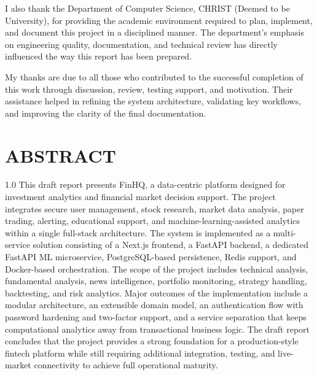 \documentclass[12pt,a4paper]{report}
\newcommand{\projectshort}{FinHQ}
\begin{document}
I also thank the Department of Computer Science, CHRIST (Deemed to be University), for providing the academic environment required to plan, implement, and document this project in a disciplined manner. The department's emphasis on engineering quality, documentation, and technical review has directly influenced the way this report has been prepared.

My thanks are due to all those who contributed to the successful completion of this work through discussion, review, testing support, and motivation. Their assistance helped in refining the system architecture, validating key workflows, and improving the clarity of the final documentation.

\chapter*{ABSTRACT}
\begin{spacing}{1.0}
This draft report presents \projectshort, a data-centric platform designed for investment analytics and financial market decision support. The project integrates secure user management, stock research, market data analysis, paper trading, alerting, educational support, and machine-learning-assisted analytics within a single full-stack architecture. The system is implemented as a multi-service solution consisting of a Next.js frontend, a FastAPI backend, a dedicated FastAPI ML microservice, PostgreSQL-based persistence, Redis support, and Docker-based orchestration. The scope of the project includes technical analysis, fundamental analysis, news intelligence, portfolio monitoring, strategy handling, backtesting, and risk analytics. Major outcomes of the implementation include a modular architecture, an extensible domain model, an authentication flow with password hardening and two-factor support, and a service separation that keeps computational analytics away from transactional business logic. The draft report concludes that the project provides a strong foundation for a production-style fintech platform while still requiring additional integration, testing, and live-market connectivity to achieve full operational maturity.
\end{spacing}

{\pagestyle{empty}\tableofcontents\clearpage}
\listoftables
{}
\clearpage
\listoffigures
{}
\clearpage
\end{document}
